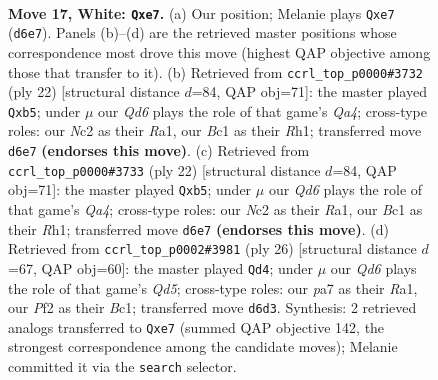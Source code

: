 \documentclass[11pt]{article}
\begin{document}
\clearpage

\begin{figure}[p]\centering
\begin{subfigure}{0.46\textwidth}\centering
\resizebox{\linewidth}{!}{%
\newchessgame
\chessboard[
  setfen={r1b2rk1/pp2qp1p/2nQpnp1/2P5/2P5/4P3/P1N1BPPP/1RB2RK1 w - - 0 17},
  showmover=false,
  pgfstyle=straightmove, color=movearrow, markmove={d6-e7}
]}
\caption{}
\end{subfigure}\hfill
\begin{subfigure}{0.46\textwidth}\centering
\resizebox{\linewidth}{!}{%
\newchessgame
\chessboard[
  setfen={r3kb1r/ppn1pp1p/2n3p1/1qp5/Q3P3/6P1/PP1NPPBP/R1B1K2R w KQkq - 3 12},
  showmover=false,
  pgfstyle=straightmove, color=movearrow, markmove={a4-b5}
]}
\caption{}
\end{subfigure}
\\[4pt]
\begin{subfigure}{0.46\textwidth}\centering
\resizebox{\linewidth}{!}{%
\newchessgame
\chessboard[
  setfen={r3kb1r/ppn1pp1p/2n3p1/1qp5/Q3P3/6P1/PP1NPPBP/R1B1K2R w KQkq - 3 12},
  showmover=false,
  pgfstyle=straightmove, color=movearrow, markmove={a4-b5}
]}
\caption{}
\end{subfigure}\hfill
\begin{subfigure}{0.46\textwidth}\centering
\resizebox{\linewidth}{!}{%
\newchessgame
\chessboard[
  setfen={r1b2rk1/1p1pqppp/2p5/p1PQn3/8/P3P3/1P2BPPP/R1B1K2R w KQ - 0 14},
  showmover=false,
  pgfstyle=straightmove, color=movearrow, markmove={d5-d4}
]}
\caption{}
\end{subfigure}
\caption{\textbf{Move 17, White: \texttt{Qxe7}.} (a) Our position; Melanie plays \texttt{Qxe7} (\texttt{d6e7}). Panels (b)--(d) are the retrieved master positions whose correspondence most drove this move (highest QAP objective among those that transfer to it). (b) Retrieved from \texttt{ccrl\_top\_p0000\#3732} (ply 22) [structural distance $d$=84, QAP obj=71]: the master played \texttt{Qxb5}; under $\mu$ our \emph{Qd6} plays the role of that game's \emph{Qa4}; cross-type roles: our \emph{N}c2 as their \emph{R}a1, our \emph{B}c1 as their \emph{R}h1; transferred move \texttt{d6e7} \textbf{(endorses this move)}. (c) Retrieved from \texttt{ccrl\_top\_p0000\#3733} (ply 22) [structural distance $d$=84, QAP obj=71]: the master played \texttt{Qxb5}; under $\mu$ our \emph{Qd6} plays the role of that game's \emph{Qa4}; cross-type roles: our \emph{N}c2 as their \emph{R}a1, our \emph{B}c1 as their \emph{R}h1; transferred move \texttt{d6e7} \textbf{(endorses this move)}. (d) Retrieved from \texttt{ccrl\_top\_p0002\#3981} (ply 26) [structural distance $d$=67, QAP obj=60]: the master played \texttt{Qd4}; under $\mu$ our \emph{Qd6} plays the role of that game's \emph{Qd5}; cross-type roles: our \emph{p}a7 as their \emph{R}a1, our \emph{P}f2 as their \emph{B}c1; transferred move \texttt{d6d3}. Synthesis: 2 retrieved analogs transferred to \texttt{Qxe7} (summed QAP objective 142, the strongest correspondence among the candidate moves); Melanie committed it via the \texttt{search} selector.}
\label{fig:thought-m32}
\end{figure}
\end{document}
